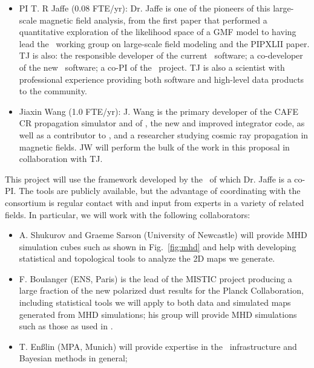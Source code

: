 \begin{itemize}
\item PI T. R Jaffe (0.08 FTE/yr): Dr. Jaffe is one of the pioneers of
  this large-scale magnetic field analysis, from the
  first paper that performed a quantitative exploration of the
  likelihood space of a GMF model \citep{jaffe10} to having lead the \planck\ working group on large-scale field modeling and the PIPXLII paper. TJ is also: the responsible
  developer of the current \hammurabi\ software; a co-developer of the
  new \hammurabix\ software; a co-PI of the \imagine\ project. TJ is
  also a scientist with professional experience providing both software and high-level data
  products to the community.

\item Jiaxin Wang (1.0 FTE/yr): J. Wang is the primary developer of the CAFE CR propagation simulator and of \hammurabix, the new and improved integrator code, as well as a contributor to \imagineSW, and a researcher studying cosmic ray propagation in magnetic fields.  JW will perform the bulk of the work in this proposal in collaboration with TJ.  


\end{itemize}

This project will use the framework developed by the
\imagineC\, of which Dr. Jaffe is a co-PI. The tools are publicly
available, but the advantage of coordinating with the consortium is
regular contact with and input from experts in a variety of related
fields. In particular, we will work with the following collaborators:

\begin{itemize}
\item A. Shukurov and Graeme Sarson (University of Newcastle) will 
  provide MHD simulation cubes such as shown in Fig.~\ref{fig:mhd} and
  help with developing statistical and topological tools to analyze
  the 2D maps we generate.

\item F. Boulanger (ENS, Paris) is the lead of the
  MISTIC  project producing a large fraction of the new polarized dust results
  for the Planck Collaboration, including statistical tools we will apply to both data and simulated maps generated from MHD simulations; his group will provide MHD simulations such as those as used in \citet{pipXX}. 

\item T. En{\ss}lin (MPA, Munich) will provide expertise
  in the \imagineSW\ infrastructure and Bayesian methods in general;

 \end{itemize}

